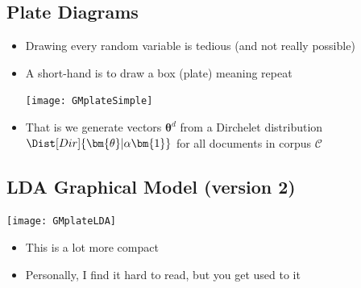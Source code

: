 \begin{slide}
\section{Plate Diagrams}

\begin{PauseHighLight}
  \begin{itemize}
  \item Drawing every random variable is tedious (and not really
    possible)\pause
  \item A short-hand is to draw a box (plate) meaning repeat
    \begin{center}
      \texttt{[image: GMplateSimple]}\pause
    \end{center}
  \item That is we generate vectors $\bm{\theta}^{d}$ from a Dirchelet
    distribution $\Dist[Dir]{\bm{\theta}|\alpha \bm{1}}$ for all
    documents in corpus $\mathcal{C}$\pause
  \end{itemize}
\end{PauseHighLight}

\end{slide}



\begin{slide}
\section{LDA Graphical Model (version 2)}

\begin{center}
  \texttt{[image: GMplateLDA]}
\end{center}
\begin{PauseHighLight}
  \begin{itemize}
  \item This is a lot more compact\pause
  \item Personally, I find it hard to read, but you get used to it\pause
  \end{itemize}
\end{PauseHighLight}

\end{slide}


